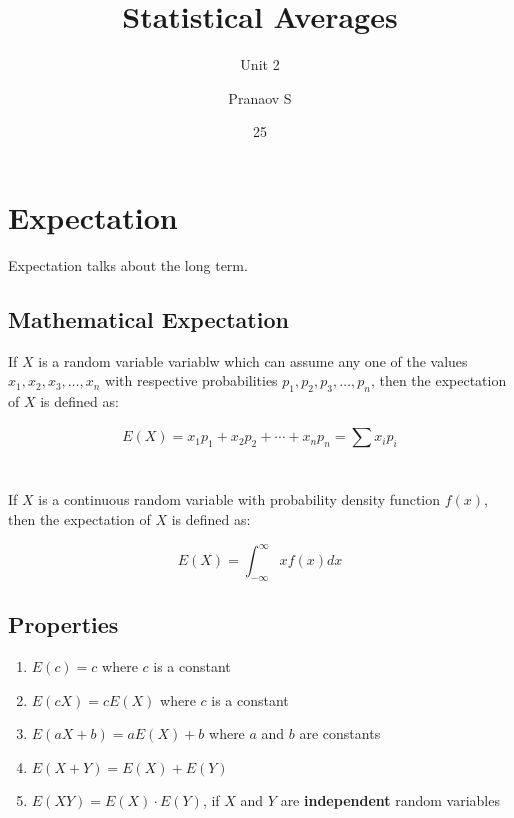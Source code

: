 \documentclass[english,course]{lecture}
\title{Statistical Averages}
\subtitle{Unit 2}
\author{Pranaov S}
\date{25}{02}{2025}
\begin{document}
\newpage

\section{Expectation}

Expectation talks about the long term.

\subsection{Mathematical Expectation}

If $X$ is a random variable variablw which can assume any one of the values $x_{1}, x_{2}, x_{3}, \dots, x_{n}$
with respective probabilities $p_1, p_2, p_3, \dots, p_n$, then the expectation of $X$ is defined as:

\[
  E(X) = x_{1}p_1 + x_{2} p_2 + \cdots + x_n p_n = \sum_{}^{}x_i p_i
\]

\\

If $X$ is a continuous random variable with probability density function $f(x)$, then the expectation of $X$ is defined as:

\[
  E(X) = \int_{-\infty}^{\infty} x f(x) dx
\]

\subsection{Properties}

\begin{enumerate}
    \item $E(c) = c$ where $c$ is a constant
    \item $E(cX) = cE(X)$ where $c$ is a constant
    \item $E(aX + b) = aE(X) + b$ where $a$ and $b$ are constants
    \item $E(X + Y) = E(X) + E(Y)$
    \item $E(XY) = E(X) \cdot E(Y)$, if $X$ and $Y$ are \textbf{independent} random variables
\end{enumerate}
\end{document}
